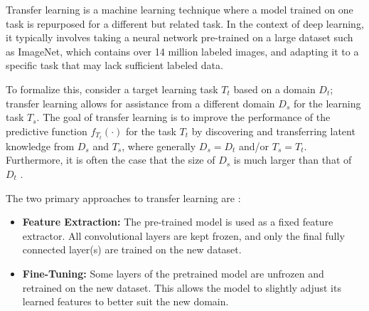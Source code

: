 Transfer learning is a machine learning technique where a model trained on one task is repurposed for a different but related task. In the context of deep learning, it typically involves taking a neural network pre-trained on a large dataset such as ImageNet, which contains over 14 million labeled images, and adapting it to a specific task that may lack sufficient labeled data.

To formalize this, consider a target learning task \( T_t \) based on a domain \( D_t \); transfer learning allows for assistance from a different domain \( D_s \) for the learning task \( T_s \). The goal of transfer learning is to improve the performance of the predictive function \( f_{T_t}(\cdot) \) for the task \( T_t \) by discovering and transferring latent knowledge from \( D_s \) and \( T_s \), where generally \( D_s = D_t \) and/or \( T_s = T_t \). Furthermore, it is often the case that the size of \( D_s \) is much larger than that of \( D_t \) \parencite{tan2018survey}.


The two primary approaches to transfer learning are \parencite{tan2018survey}:

\begin{itemize}
    \item \textbf{Feature Extraction:} The pre-trained model is used as a fixed feature extractor. All convolutional layers are kept frozen, and only the final fully connected layer(s) are trained on the new dataset.
    \item \textbf{Fine-Tuning:} Some layers of the pretrained model are unfrozen and retrained on the new dataset. This allows the model to slightly adjust its learned features to better suit the new domain.
\end{itemize}

